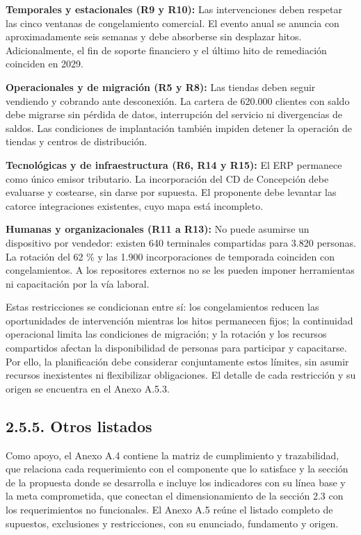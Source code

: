 \documentclass[11pt]{article}
\begin{document}
\textbf{Temporales y estacionales (R9 y R10):} Las intervenciones deben respetar las cinco ventanas de congelamiento comercial. El evento anual se anuncia con aproximadamente seis semanas y debe absorberse sin desplazar hitos. Adicionalmente, el fin de soporte financiero y el último hito de remediación coinciden en 2029.

\textbf{Operacionales y de migración (R5 y R8):} Las tiendas deben seguir vendiendo y cobrando ante desconexión. La cartera de 620.000 clientes con saldo debe migrarse sin pérdida de datos, interrupción del servicio ni divergencias de saldos. Las condiciones de implantación también impiden detener la operación de tiendas y centros de distribución.

\textbf{Tecnológicas y de infraestructura (R6, R14 y R15):} El ERP permanece como único emisor tributario. La incorporación del CD de Concepción debe evaluarse y costearse, sin darse por supuesta. El proponente debe levantar las catorce integraciones existentes, cuyo mapa está incompleto.

\textbf{Humanas y organizacionales (R11 a R13):} No puede asumirse un dispositivo por vendedor: existen 640 terminales compartidas para 3.820 personas. La rotación del 62 \% y las 1.900 incorporaciones de temporada coinciden con congelamientos. A los repositores externos no se les pueden imponer herramientas ni capacitación por la vía laboral.

Estas restricciones se condicionan entre sí: los congelamientos reducen las oportunidades de intervención mientras los hitos permanecen fijos; la continuidad operacional limita las condiciones de migración; y la rotación y los recursos compartidos afectan la disponibilidad de personas para participar y capacitarse. Por ello, la planificación debe considerar conjuntamente estos límites, sin asumir recursos inexistentes ni flexibilizar obligaciones. El detalle de cada restricción y su origen se encuentra en el Anexo A.5.3. 

\subsection{2.5.5. Otros listados}\label{otros-listados}

Como apoyo, el Anexo A.4 contiene la matriz de cumplimiento y trazabilidad, que relaciona cada requerimiento con el componente que lo satisface y la sección de la propuesta donde se desarrolla e incluye los indicadores con su línea base y la meta comprometida, que conectan el dimensionamiento de la sección 2.3 con los requerimientos no funcionales. El Anexo A.5 reúne el listado completo de supuestos, exclusiones y restricciones, con su enunciado, fundamento y origen.
\end{document}
